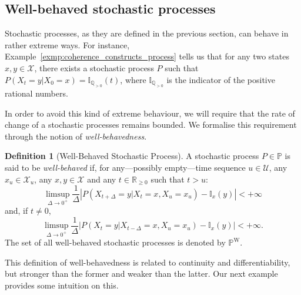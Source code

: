 \documentclass[10pt,a4paper]{paper}
\theoremstyle{definition}
\newtheorem{definition}{Definition}
\newcommand{\reals}{\mathbb{R}}
\newcommand{\states}{\mathcal{X}}
\newcommand{\processes}{\mathbb{P}}
\newcommand{\wprocesses}{\processes^{\mathrm{W}}}
\newcommand{\ind}[1]{\mathbb{I}_{#1}}
\newcommand{\abs}[1]{\left\vert #1 \right\vert}
\begin{document}
\subsection{Well-behaved stochastic processes}\label{sec:well_behaved}

Stochastic processes, as they are defined in the previous section, can behave in rather extreme ways. For instance, Example~\ref{exmp:coherence_constructs_process} tells us that for any two states $x,y\in\mathcal{X}$, there exists a stochastic process $P$ such that $P(X_t=y\vert X_0=x)=\ind{\mathbb{Q}_{>0}}(t)$, where $\ind{\mathbb{Q}_{>0}}$ is the indicator of the positive rational numbers.

In order to avoid this kind of extreme behaviour, we will require that the rate of change of a stochastic processes remains bounded. We formalise this requirement through the notion of \emph{well-behavedness}. 

\begin{definition}[Well-Behaved Stochastic Process]
\label{def:well-behaved}
A stochastic process $P\in\processes$ is said to be \emph{well-behaved} if, for any---possibly empty---time sequence $u\in\mathcal{U}$, any $x_u\in\states_u$, any $x,y\in\states$ and any $t\in\reals_{\geq0}$ such that $t>u$:
\begin{equation}\label{eq:def:well-behaved:right}
\limsup_{\Delta\to 0^{+}}\frac{1}{\Delta}\abs{P(X_{t+\Delta}=y\vert X_t=x, X_u=x_u)-\ind{x}(y)}<+\infty
\end{equation}
and, if $t\neq0$,
\begin{equation}\label{eq:def:well-behaved:left}
\limsup_{\Delta\to 0^{+}}\frac{1}{\Delta}\abs{P(X_{t}=y\vert X_{t-\Delta}=x, X_u=x_u)-\ind{x}(y)}<+\infty.
\end{equation}
The set of all well-behaved stochastic processes is denoted by $\wprocesses$.
\end{definition}

This definition of well-behavedness is related to continuity and differentiability, but stronger than the former and weaker than the latter. Our next example provides some intuition on this.
\end{document}
